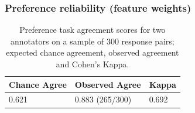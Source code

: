 \documentclass[xcolor={dvipsnames}]{beamer}
\begin{document}
\begin{frame}
\frametitle{Preference reliability (feature weights)}
\begin{table}[htb!]
\begin{center}
\begin{tabular}{|l|l|l|}
\hline
 Chance Agree & Observed Agree & Kappa \\
\hline
0.621 & 0.883 (265/300) & 0.692 \\
\hline
\end{tabular}
\caption{\label{tab:ABAgreement} Preference task agreement scores for two annotators on a sample of 300 response pairs; expected chance agreement, observed agreement and Cohen's Kappa.}
\end{center}
\end{table}

\end{frame}
\end{document}
